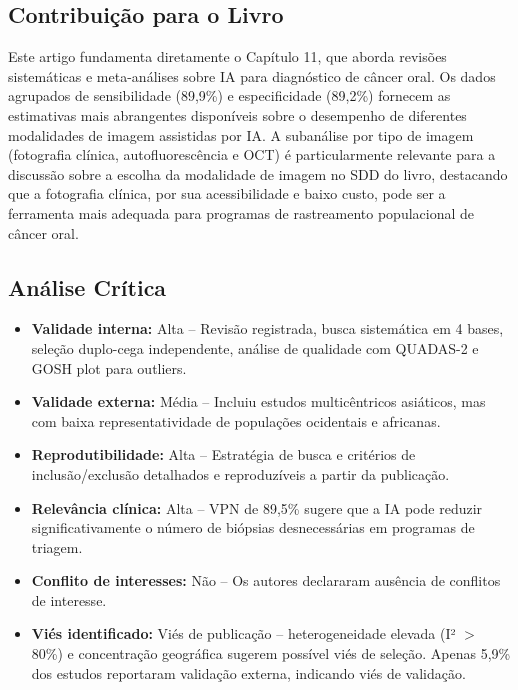 \subsection{Contribuição para o Livro}
Este artigo fundamenta diretamente o Capítulo 11, que aborda revisões
sistemáticas e meta-análises sobre IA para diagnóstico de câncer oral. Os
dados agrupados de sensibilidade (89,9\%) e especificidade (89,2\%) fornecem
as estimativas mais abrangentes disponíveis sobre o desempenho de diferentes
modalidades de imagem assistidas por IA. A subanálise por tipo de imagem
(fotografia clínica, autofluorescência e OCT) é particularmente relevante
para a discussão sobre a escolha da modalidade de imagem no SDD do livro,
destacando que a fotografia clínica, por sua acessibilidade e baixo custo,
pode ser a ferramenta mais adequada para programas de rastreamento
populacional de câncer oral.

\subsection{Análise Crítica}
\begin{itemize}
  \item \textbf{Validade interna:} Alta -- Revisão registrada, busca
        sistemática em 4 bases, seleção duplo-cega independente, análise
        de qualidade com QUADAS-2 e GOSH plot para outliers.
  \item \textbf{Validade externa:} Média -- Incluiu estudos multicêntricos
        asiáticos, mas com baixa representatividade de populações ocidentais
        e africanas.
  \item \textbf{Reprodutibilidade:} Alta -- Estratégia de busca e critérios
        de inclusão/exclusão detalhados e reproduzíveis a partir da
        publicação.
  \item \textbf{Relevância clínica:} Alta -- VPN de 89,5\% sugere que a IA
        pode reduzir significativamente o número de biópsias desnecessárias
        em programas de triagem.
  \item \textbf{Conflito de interesses:} Não -- Os autores declararam
        ausência de conflitos de interesse.
  \item \textbf{Viés identificado:} Viés de publicação -- heterogeneidade
        elevada (I² $>$ 80\%) e concentração geográfica sugerem possível
        viés de seleção. Apenas 5,9\% dos estudos reportaram validação
        externa, indicando viés de validação.
\end{itemize}


